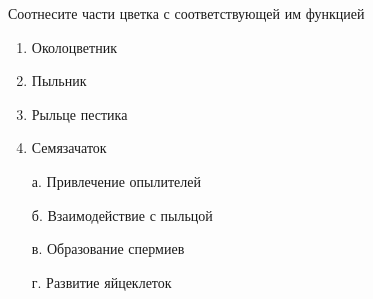 
Соотнесите
части цветка с соответствующей им функцией

\begin{multicols}{2}
    {
        \begin{enumerate}
            \item Околоцветник
            \item Пыльник
            \item Рыльце пестика
            \item Семязачаток
        \end{enumerate}
    }
    {
        \begin{enumerate}
            \item[а.] Привлечение опылителей
            \item[б.] Взаимодействие с пыльцой
            \item[в.] Образование спермиев
            \item[г.] Развитие яйцеклеток
        \end{enumerate}
    }
\end{multicols}




